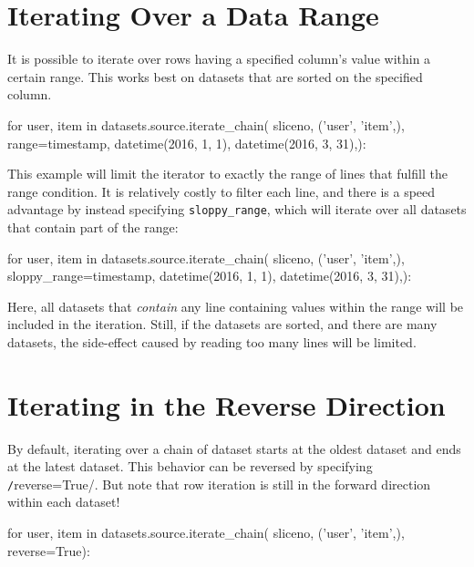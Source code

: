 \section{Iterating Over a Data Range}
\label{sec:iterate_sloppy_range}
It is possible to iterate over rows having a specified column's value
within a certain range.  This works best on datasets that are sorted
on the specified column.
\begin{python}
for user, item in datasets.source.iterate_chain(
           sliceno, ('user', 'item',),
           range={timestamp, datetime(2016, 1, 1), datetime(2016, 3, 31),}):
\end{python}
This example will limit the iterator to exactly the range of lines
that fulfill the range condition.  It is relatively costly to filter
each line, and there is a speed advantage by instead specifying
\texttt{sloppy\_range}, which will iterate over all datasets that
contain part of the range:
\begin{python}
for user, item in datasets.source.iterate_chain(
           sliceno, ('user', 'item',),
           sloppy_range={timestamp,
                         datetime(2016, 1, 1),
                         datetime(2016, 3, 31),}):
\end{python}
Here, all datasets that \textsl{contain} any line containing values
within the range will be included in the iteration.  Still, if the
datasets are sorted, and there are many datasets, the side-effect
caused by reading too many lines will be limited.



\section{Iterating in the Reverse Direction}
By default, iterating over a chain of dataset starts at the oldest
dataset and ends at the latest dataset.  This behavior can be
reversed by specifying \texttt/reverse=True/.  But note
that row iteration is still in the forward direction within each
dataset!
\begin{python}
for user, item in datasets.source.iterate_chain(
                       sliceno, ('user', 'item',),
                       reverse=True):
\end{python}




